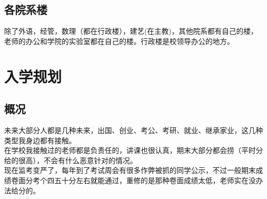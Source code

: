 \documentclass[12pt]{article} %
\begin{document}
	\subsection{各院系楼}
	除了外语，经管，数理（都在行政楼），建艺(在主教)，其他院系都有自己的楼，老师的办公和学院的实验室都在自己的楼。行政楼是校领导办公的地方。
	
	\newpage
		
	
	
	
	
	
	
	
	\section{入学规划} 
	\subsection{概况}
	未来大部分人都是几种未来，出国、创业、考公、考研、就业、继承家业，这几种类型我身边都有接触。\\
	
	在学校我接触过的老师都是负责任的，讲课也很认真，期末大部分都会捞（平时分给的很高），不会有什么恶意针对的情况。\\
	
	现在监考变严了，每年到了考试周会有很多作弊被抓的同学公示，不过一般期末成绩卷面分考个四五十分左右就能通过，重修的是那种卷面成绩太低，老师实在没办法给分的。
	
\end{document}
